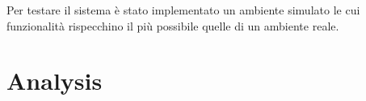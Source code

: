 \documentclass{memoir}
\begin{document}
Per testare il sistema è stato implementato un ambiente simulato le cui
funzionalità rispecchino il più possibile quelle di un ambiente reale.



\chapter{Analysis}\label{ch:analysis}

\end{document}
